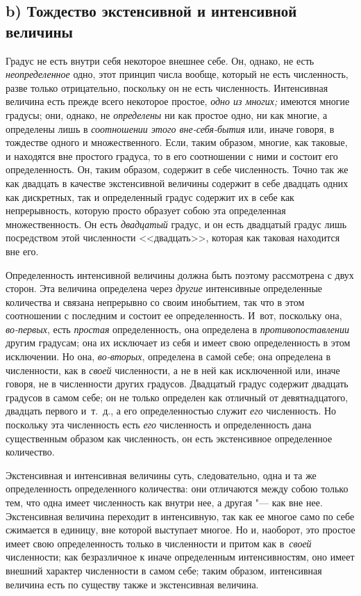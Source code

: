 \subsection[b) Тождество экстенсивной и интенсивной величины]%
{b) Тождество экстенсивной и интенсивной величины}

Градус не есть внутри себя некоторое внешнее себе. Он, однако, не есть
{\em неопределенное} одно, этот принцип числа вообще, который не есть
численность, разве только отрицательно, поскольку он не есть численность.
Интенсивная величина есть прежде всего некоторое простое, {\em одно из многих;}
имеются многие градусы; они, однако, не {\em определены} ни как простое одно,
ни как многие, а определены лишь в {\em соотношении этого вне-себя-бытия} или,
иначе говоря, в тождестве одного и множественного. Если, таким образом, многие,
как таковые, и находятся вне простого градуса, то в его соотношении с ними и
состоит его определенность. Он, таким образом, содержит в себе численность.
Точно так же как двадцать в качестве экстенсивной величины содержит в себе
двадцать одних как дискретных, так и определенный градус содержит их в себе как
непрерывность, которую просто образует собою эта определенная множественность.
Он есть {\em двадцатый} градус, и он есть двадцатый градус лишь посредством
этой численности <<двадцать>>, которая как таковая находится вне его.

Определенность интенсивной величины должна быть поэтому рассмотрена с двух
сторон. Эта величина определена через {\em другие} интенсивные определенные
количества и связана непрерывно со своим инобытием, так что в этом соотношении
с последним и состоит ее определенность. И~вот, поскольку она, {\em во-первых},
есть {\em простая} определенность, она определена в {\em противопоставлении}
другим градусам; она их исключает из себя и имеет свою определенность в этом
исключении. Но она, {\em во-вторых}, определена в самой себе; она определена в
численности, как в {\em своей} численности, а не в ней как исключенной или,
иначе говоря, не в численности других градусов. Двадцатый градус содержит
двадцать градусов в самом себе; он не только определен как отличный от
девятнадцатого, двадцать первого и~т.~д., а его определенностью служит
{\em его} численность. Но поскольку эта численность есть {\em его} численность
и определенность дана существенным образом как численность, он есть
экстенсивное определенное количество.

Экстенсивная и интенсивная величины суть, следовательно, одна и та же
определенность определенного количества: они отличаются между собою только тем,
что одна имеет численность как внутри нее, а другая "--- как вне нее.
Экстенсивная величина переходит в интенсивную, так как ее многое само по себе
сжимается в единицу, вне которой выступает многое. Но и, наоборот, это простое
имеет свою определенность только в численности и притом как в~{\em своей}
численности; как безразличное к иначе определенным интенсивностям, оно имеет
внешний характер численности в самом себе; таким образом, интенсивная величина
есть по существу также и экстенсивная величина.


